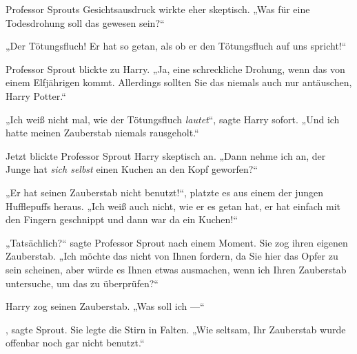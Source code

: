 Professor Sprouts Gesichtsausdruck wirkte eher skeptisch.
„Was für eine Todesdrohung soll das gewesen sein?“

„Der Tötungsfluch! Er hat so getan, als ob er den Tötungsfluch auf uns spricht!“

Professor Sprout blickte zu Harry.
„Ja, eine schreckliche Drohung, wenn das von einem Elfjährigen kommt. Allerdings sollten Sie das niemals auch nur antäuschen, Harry Potter.“

„Ich weiß nicht mal, wie der Tötungsfluch \emph{lautet}“, sagte Harry sofort.
„Und ich hatte meinen Zauberstab niemals rausgeholt.“

Jetzt blickte Professor Sprout Harry skeptisch an.
„Dann nehme ich an, der Junge hat \emph{sich selbst} einen Kuchen an den Kopf geworfen?“

„Er hat seinen Zauberstab nicht benutzt!“, platzte es aus einem der jungen Hufflepuffs heraus.
„Ich weiß auch nicht, wie er es getan hat, er hat einfach mit den Fingern geschnippt und dann war da ein Kuchen!“

„Tatsächlich?“ sagte Professor Sprout nach einem Moment. Sie zog ihren eigenen Zauberstab.
„Ich möchte das nicht von Ihnen fordern, da Sie hier das Opfer zu sein scheinen, aber würde es Ihnen etwas ausmachen, wenn ich Ihren Zauberstab untersuche, um das zu überprüfen?“

Harry zog seinen Zauberstab.
„Was soll ich —“

, sagte Sprout. Sie legte die Stirn in Falten.
„Wie seltsam, Ihr Zauberstab wurde offenbar noch gar nicht benutzt.“

